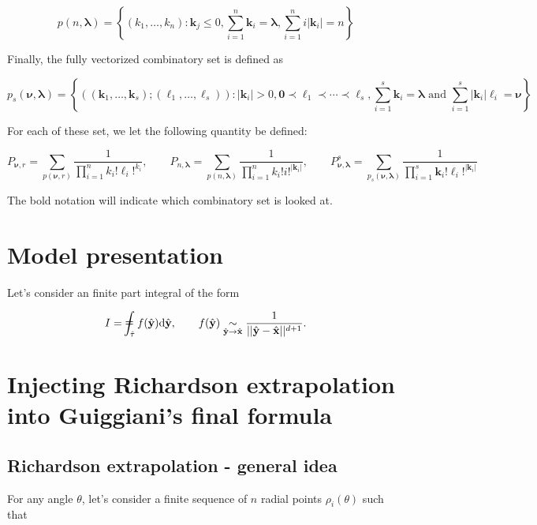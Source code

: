 ﻿\documentclass{article}
\begin{document}
\begin{equation}
  p(n, \bm\lambda) = \left\{(k_1,\dots,k_n):\bm k_j \leq 0, \sum_{i=1}^{n}\bm k_i=\bm\lambda, \sum_{i=1}^{n}i|\bm k_i|=n\right\}
\end{equation}

Finally, the fully vectorized combinatory set is defined as

\begin{equation}
  p_s(\bm\nu, \bm\lambda) = \left\{((\bm k_1, \dots, \bm k_s); (\ell_1, \dots, \ell_s)): |\bm k_i| > 0, \bm 0 \prec \bm\ell_1\prec\cdots\prec\bm\ell_s, \sum_{i=1}^{s}\bm k_i = \bm\lambda\text{ and }\sum_{i=1}^{s}|\bm k_i|\bm\ell_i = \bm\nu\right\}
\end{equation}

For each of these set, we let the following quantity be defined:

\begin{equation}
  P_{\bm\nu, r} = \sum_{p(\bm\nu, r)}\frac{1}{\prod_{i=1}^{n}k_i!\bm\ell_i!^{k_i}}, \qquad P_{n, \bm\lambda} = \sum_{p(n, \bm\lambda)}\frac{1}{\prod_{i=1}^{n}k_i!i!^{|\bm k_i|}}, \qquad P_{\bm\nu, \bm\lambda}^s = \sum_{p_s(\bm\nu, \bm\lambda)}\frac{1}{\prod_{i=1}^{s}\bm k_i!\bm\ell_i!^{|\bm k_i|}}
\end{equation}

The bold notation will indicate which combinatory set is looked at.

\section{Model presentation}
Let's consider an finite part integral of the form

\begin{equation}
    I = \ddashint_{\hat{\tau}}f(\hat{\mathbf y})\mathrm d\hat{\mathbf y}, \qquad f(\hat{\mathbf y}) \underset{\hat{\mathbf y} \to \hat{\mathbf x}}{\sim} \frac{1}{|| \hat{\mathbf y} - \hat{\mathbf x}||^{d+1}}.
\end{equation}

\section{Injecting Richardson extrapolation into Guiggiani's final formula}
\subsection{Richardson extrapolation - general idea}

For any angle $\theta$, let's consider a finite sequence of $n$ radial points $\rho_i(\theta)$ such that
\end{document}
